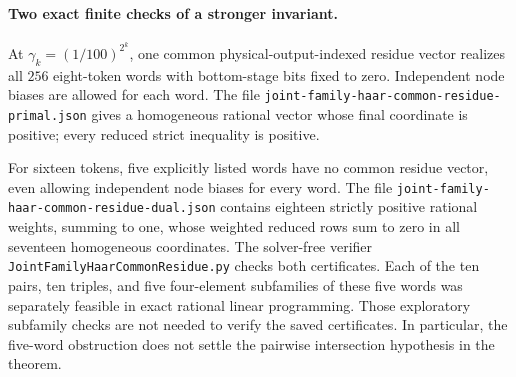 \documentclass{article}
\begin{document}
\paragraph{Two exact finite checks of a stronger invariant.}
At $\gamma_k=(1/100)^{2^k}$, one common physical-output-indexed residue
vector realizes all $256$ eight-token words with bottom-stage bits fixed
to zero. Independent node biases are allowed for each word. The file
\texttt{joint-family-haar-common-residue-primal.json} gives a homogeneous
rational vector whose final coordinate is positive; every reduced
strict inequality is positive.

For sixteen tokens, five explicitly listed words have no common residue
vector, even allowing independent node biases for every word. The file
\texttt{joint-family-haar-common-residue-dual.json} contains eighteen
strictly positive rational weights, summing to one, whose weighted
reduced rows sum to zero in all seventeen homogeneous coordinates.
The solver-free verifier
\texttt{JointFamilyHaarCommonResidue.py} checks both certificates.
Each of the ten pairs, ten triples, and five four-element subfamilies of
these five words was separately feasible in exact rational linear
programming. Those exploratory subfamily checks are not needed to
verify the saved certificates. In particular, the five-word obstruction
does not settle the pairwise intersection hypothesis in the theorem.
\end{document}

